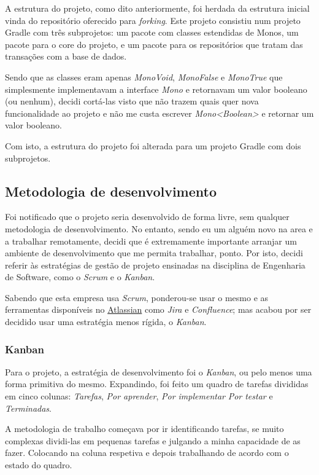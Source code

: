 A estrutura do projeto, como dito anteriormente, foi herdada da estrutura inicial vinda do repositório oferecido para \textit{forking}. Este projeto consistiu num projeto Gradle com três subprojetos: um pacote com classes estendidas de Monos, um pacote para o core do projeto, e um pacote para os repositórios que tratam das transações com a base de dados.

Sendo que as classes eram apenas \textit{MonoVoid}, \textit{MonoFalse} e \textit{MonoTrue} que simplesmente implementavam a interface \textit{Mono} e retornavam um valor booleano (ou nenhum), decidi cortá-las visto que não trazem quais quer nova funcionalidade ao projeto e não me custa escrever \textit{Mono<Boolean>} e retornar um valor booleano.

Com isto, a estrutura do projeto foi alterada para um projeto Gradle com dois subprojetos.

\subsection{Metodologia de desenvolvimento}

Foi notificado que o projeto seria desenvolvido de forma livre, sem qualquer metodologia de desenvolvimento. No entanto, sendo eu um alguém novo na area e a trabalhar remotamente, decidi que é extremamente importante arranjar um ambiente de desenvolvimento que me permita trabalhar, ponto. Por isto, decidi referir às estratégias de gestão de projeto ensinadas na disciplina de Engenharia de Software, como o \textit{Scrum} e o \textit{Kanban}.

Sabendo que esta empresa usa \textit{Scrum}, ponderou-se usar o mesmo e as ferramentas disponíveis no \href{https://www.atlassian.com/}{Atlassian} como \textit{Jira} e \textit{Confluence}; mas acabou por ser decidido usar uma estratégia menos rígida, o \textit{Kanban}.

\subsubsection{Kanban}

Para o projeto, a estratégia de desenvolvimento foi o \textit{Kanban}, ou pelo menos uma forma primitiva do mesmo. Expandindo, foi feito um quadro de tarefas divididas em cinco colunas: \textit{Tarefas}, \textit{Por aprender}, \textit{Por implementar} \textit{Por testar} e \textit{Terminadas}.

A metodologia de trabalho começava por ir identificando tarefas, se muito complexas dividi-las em pequenas tarefas e julgando a minha capacidade de as fazer. Colocando na coluna respetiva e depois trabalhando de acordo com o estado do quadro.


